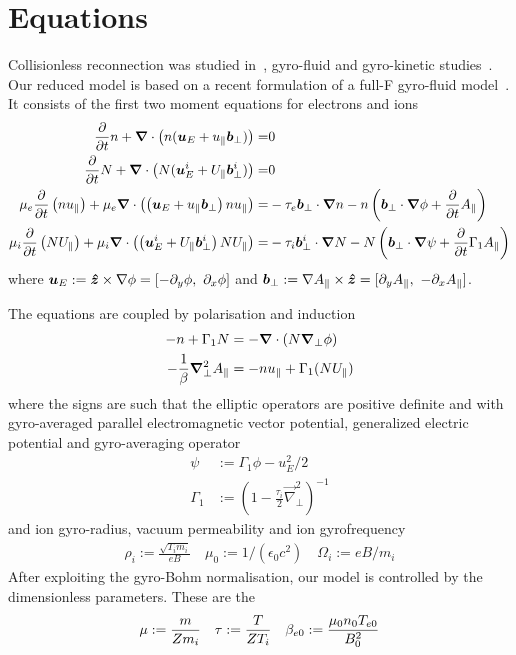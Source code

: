 \section{Equations}
Collisionless reconnection was studied in~\cite{Stanier2015}, gyro-fluid and gyro-kinetic studies~\cite{Comisso2013,Zacharias2014}.
Our reduced model is based on a recent formulation of a full-F gyro-fluid model~\cite{Madsen2013}.
It consists of the first two moment equations for electrons and ions
\begin{align}
\frac{\partial}{\partial t} n 
+ {\boldsymbol{\nabla}}\cdot\left( n  ({\boldsymbol{u}}_E + u_\parallel {\boldsymbol{b}}_\perp) \right)=& 0
\\
\label{firstgyromom}
\frac{\partial}{\partial t} N 
+ {\boldsymbol{\nabla}}\cdot\left( N ({\boldsymbol{u}}_E^i + U_\parallel {\boldsymbol{b}}_\perp^i) \right)=& 0
 \\
    \mu_e \frac{\partial}{\partial t} \left( n u_\parallel \right)
+  \mu_e {\boldsymbol{\nabla}}\cdot\left( \left({\boldsymbol{u}}_E+ u_\parallel{\boldsymbol{b}}_\perp\right) n u_\parallel \right) =&
- \tau_e {\boldsymbol{b}}_\perp\cdot{\boldsymbol{\nabla}}n  - n \left({\boldsymbol{b}}_\perp\cdot{\boldsymbol{\nabla}}\phi +\frac{\partial}{\partial t}A_\parallel\right)
      \\
  \mu_i\frac{\partial}{\partial t} \left( NU_\parallel \right)
      +  \mu_i{\boldsymbol{\nabla}}\cdot\left( \left({\boldsymbol{u}}_E^i + U_\parallel {\boldsymbol{b}}_\perp^i\right) NU_\parallel \right) =&
      - \tau_i  {\boldsymbol{b}}_\perp^i \cdot{\boldsymbol{\nabla}} N - N \left({\boldsymbol{b}}_\perp \cdot{\boldsymbol{\nabla}} \psi + \frac{\partial}{\partial t} \Gamma_1A_\parallel\right)
\end{align}
where
${\boldsymbol{u}}_E := \bm{\hat{z}} \times \nabla\phi = [-\partial_y \phi,\ \partial_x \phi]$ and
$ {\boldsymbol{b}}_\perp := \nabla A_\parallel \times \bm{\hat{z}} = [\partial_y A_\parallel,\ -\partial_x A_\parallel]$.

The equations are coupled by polarisation and induction
\begin{align}
 -n  + \Gamma_1 N &= -{\boldsymbol{\nabla}}\cdot\left(N {\boldsymbol{\nabla}}_\perp \phi\right) \\
 -\frac{1}{\beta} {\boldsymbol{\nabla}}_\perp^2 A_\parallel &=  -n  u_\parallel + \Gamma_1 (N U_\parallel)
\end{align}
where the signs are such that the elliptic operators are positive definite and
with gyro-averaged parallel electromagnetic vector potential, generalized electric potential and gyro-averaging operator
\begin{align}
 \psi &:= \Gamma_1 \phi - u_E^2 /2  \\
  \Gamma_1 &:= (1-\frac{\tau_i}{2} \vec{\nabla}_\perp^2 )^{-1}
\end{align}
and ion gyro-radius, vacuum permeability and ion gyrofrequency
\begin{align}
  \rho_{i}   := \frac{\sqrt{T_{i} m_i}}{e B} \quad
  \mu_0 := 1/(\epsilon_0 c^2) \quad
  \Omega_i := e B / m_i
\end{align}
After exploiting the gyro-Bohm normalisation, our model is controlled by the dimensionless parameters. These
are the
\begin{align}
 \mu   :=  \frac{m}{Z m_i} \quad
 \tau  :=  \frac{T}{ Z T_i}\quad
 \beta_{e0} :=  \frac{\mu_0 n_0 T_{e0} }{ B_0^2 }
\end{align}


